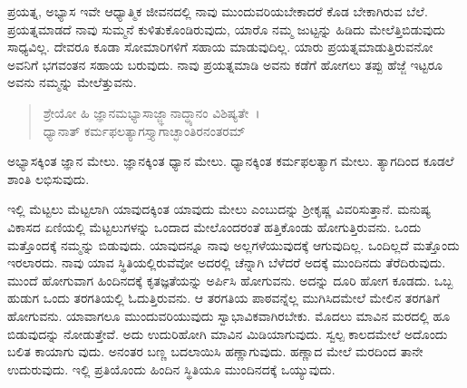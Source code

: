 ಪ್ರಯತ್ನ, ಅಭ್ಯಾಸ ಇವೇ ಆಧ್ಯಾತ್ಮಿಕ ಜೀವನದಲ್ಲಿ ನಾವು ಮುಂದುವರಿಯಬೇಕಾದರೆ ಕೊಡ ಬೇಕಾಗಿರುವ ಬೆಲೆ. ಪ್ರಯತ್ನಮಾಡದೆ ನಾವು ಸುಮ್ಮನೆ ಕುಳಿತುಕೊಂಡಿರುವುದು, ಯಾರೊ ನಮ್ಮ ಜುಟ್ಟನ್ನು ಹಿಡಿದು ಮೇಲೆತ್ತಿಬಿಡುವುದು ಸಾಧ್ಯವಿಲ್ಲ. ದೇವರೂ ಕೂಡಾ ಸೋಮಾರಿಗಳಿಗೆ ಸಹಾಯ ಮಾಡುವುದಿಲ್ಲ. ಯಾರು ಪ್ರಯತ್ನಮಾಡುತ್ತಿರುವನೋ ಅವನಿಗೆ ಭಗವಂತನ ಸಹಾಯ ಬರುವುದು. ನಾವು ಪ್ರಯತ್ನಮಾಡಿ ಅವನು ಕಡೆಗೆ ಹೋಗಲು ತಪ್ಪು ಹೆಜ್ಜೆ ಇಟ್ಟರೂ ಅವನು ನಮ್ಮನ್ನು ಮೇಲೆತ್ತುವನು.

\begin{verse}
ಶ್ರೇಯೋ ಹಿ ಜ್ಞಾನಮಭ್ಯಾಸಾಜ್ಜ್ಞಾನಾದ್ಧ್ಯಾನಂ ವಿಶಿಷ್ಯತೇ~।\\ಧ್ಯಾನಾತ್ ಕರ್ಮಫಲತ್ಯಾಗಸ್ತ್ಯಾಗಾಚ್ಛಾಂತಿರನಂತರಮ್ 
\end{verse}

{\small ಅಭ್ಯಾಸಕ್ಕಿಂತ ಜ್ಞಾನ ಮೇಲು. ಜ್ಞಾನಕ್ಕಿಂತ ಧ್ಯಾನ ಮೇಲು. ಧ್ಯಾನಕ್ಕಿಂತ ಕರ್ಮಫಲತ್ಯಾಗ ಮೇಲು. ತ್ಯಾಗದಿಂದ ಕೂಡಲೆ ಶಾಂತಿ ಲಭಿಸುವುದು.}

ಇಲ್ಲಿ ಮೆಟ್ಟಲು ಮೆಟ್ಟಲಾಗಿ ಯಾವುದಕ್ಕಿಂತ ಯಾವುದು ಮೇಲು ಎಂಬುದನ್ನು ಶ‍್ರೀಕೃಷ್ಣ ವಿವರಿಸುತ್ತಾನೆ. ಮನುಷ್ಯ ವಿಕಾಸದ ಏಣಿಯಲ್ಲಿ ಮೆಟ್ಟಲುಗಳನ್ನು ಒಂದಾದ ಮೇಲೊಂದರಂತೆ ಹತ್ತಿಕೊಂಡು ಹೋಗುತ್ತಿರುವನು. ಒಂದು ಮತ್ತೊಂದಕ್ಕೆ ನಮ್ಮನ್ನು ಬಿಡುವುದು. ಯಾವುದನ್ನೂ ನಾವು ಅಲ್ಲಗಳೆಯುವುದಕ್ಕೆ ಆಗುವುದಿಲ್ಲ. ಒಂದಿಲ್ಲದೆ ಮತ್ತೊಂದು ಇರಲಾರದು. ನಾವು ಯಾವ ಸ್ಥಿತಿಯಲ್ಲಿರುವೆವೋ ಅದರಲ್ಲಿ ಚೆನ್ನಾಗಿ ಬೆಳೆದರೆ ಅದಕ್ಕೆ ಮುಂದಿನದು ತೆರೆದಿರುವುದು. ಮುಂದೆ ಹೋಗುವಾಗ ಹಿಂದಿನದಕ್ಕೆ ಕೃತಜ್ಞತೆಯನ್ನು ಅರ್ಪಿಸಿ ಹೋಗುವನು. ಅದನ್ನು ದೂರಿ ಹೋಗ ಕೂಡದು. ಒಬ್ಬ ಹುಡುಗ ಒಂದು ತರಗತಿಯಲ್ಲಿ ಓದುತ್ತಿರುವನು. ಆ ತರಗತಿಯ ಪಾಠವನ್ನೆಲ್ಲ ಮುಗಿಸಿದಮೇಲೆ ಮೇಲಿನ ತರಗತಿಗೆ ಹೋಗುವನು. ಯಾವಾಗಲೂ ಮುಂದುವರಿಯುವುದು ಸ್ವಾಭಾವಿಕವಾಗಿರಬೇಕು. ಮೊದಲು ಮಾವಿನ ಮರದಲ್ಲಿ ಹೂ ಬಿಡುವುದನ್ನು ನೋಡುತ್ತೇವೆ. ಅದು ಉದುರಿಹೋಗಿ ಮಾವಿನ ಮಿಡಿಯಾಗುವುದು. ಸ್ವಲ್ಪ ಕಾಲದಮೇಲೆ ಅದೊಂದು ಬಲಿತ ಕಾಯಾಗು ವುದು. ಅನಂತರ ಬಣ್ಣ ಬದಲಾಯಿಸಿ ಹಣ್ಣಾಗುವುದು. ಹಣ್ಣಾದ ಮೇಲೆ ಮರದಿಂದ ತಾನೇ ಉದುರುವುದು. ಇಲ್ಲಿ ಪ್ರತಿಯೊಂದು ಹಿಂದಿನ ಸ್ಥಿತಿಯೂ ಮುಂದಿನದಕ್ಕೆ ಒಯ್ಯುವುದು.

